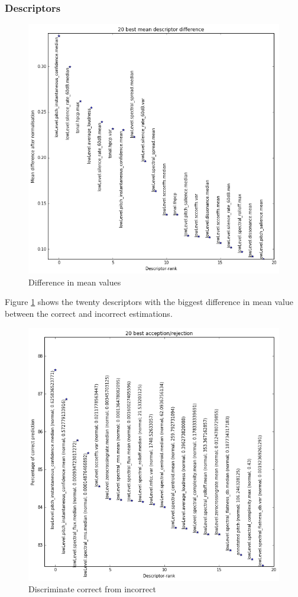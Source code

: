 \documentclass{article}
\begin{document}
\subsubsection{Descriptors}
\begin{figure}
    \centering
    \includegraphics[scale=0.5]{img/pred_descr.png}
    \caption{Difference in mean values}
    \label{fig:pred_desc}
\end{figure}
Figure \ref{fig:pred_desc} shows the twenty descriptors with the biggest difference in mean value between the correct and incorrect estimations. 
\begin{figure}
    \centering
    \includegraphics[scale=0.5]{img/pn_descr.png}
    \caption{Discriminate correct from incorrect}
    \label{fig:pn_desc}
\end{figure}
\end{document}
